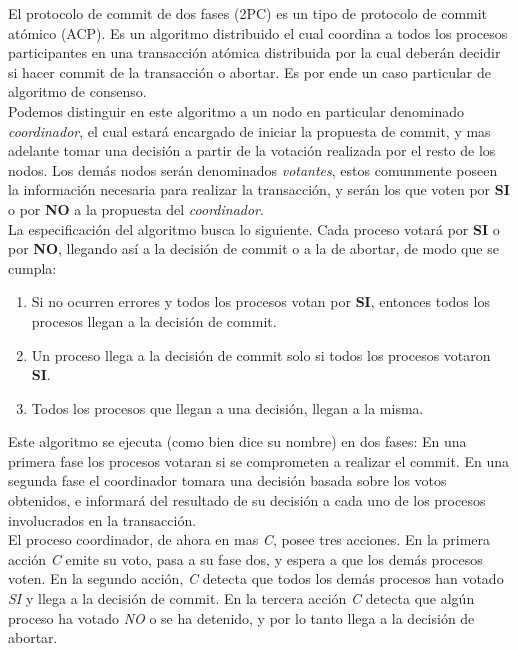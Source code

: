 \documentclass[titlepage, 12pt]{book}
\begin{document}
El protocolo de commit de dos fases (2PC) es un tipo de protocolo de commit at\'omico (ACP). Es un algoritmo distribuido el cual coordina a todos los procesos participantes en una transacci\'on at\'omica distribuida por la cual deber\'an decidir si hacer commit de la transacci\'on o abortar. Es por ende un caso particular de algoritmo de consenso.\\

Podemos distinguir en este algoritmo a un nodo en particular denominado \textit{coordinador}, el cual estar\'a encargado de iniciar la propuesta de commit, y mas adelante tomar una decisi\'on a partir de la votaci\'on realizada por el resto de los nodos. Los dem\'as nodos ser\'an denominados \textit{votantes}, estos comunmente poseen la informaci\'on necesaria para realizar la transacci\'on, y ser\'an los que voten por \textbf{SI} o por \textbf{NO} a la propuesta del \textit{coordinador}.\\

La especificaci\'on del algoritmo busca lo siguiente. Cada proceso votar\'a por \textbf{SI} o por \textbf{NO}, llegando as\'i a la decisi\'on de commit o a la de abortar, de modo que se cumpla:
\begin{enumerate}
\item Si no ocurren errores y todos los procesos votan por \textbf{SI}, entonces todos los procesos llegan a la decisi\'on de commit.
\item Un proceso llega a la decisi\'on de commit solo si todos los procesos votaron \textbf{SI}.
\item Todos los procesos que llegan a una decisi\'on, llegan a la misma.
\end{enumerate}


Este algoritmo se ejecuta (como bien dice su nombre) en dos fases: En una primera fase los procesos votaran si se comprometen a realizar el commit. En una segunda fase el coordinador tomara una decisi\'on basada sobre los votos obtenidos, e informar\'a del resultado de su decisi\'on a cada uno de los procesos involucrados en la transacci\'on\cite{Arora}.\\

El proceso coordinador, de ahora en mas \textit{C}, posee tres acciones. En la primera acci\'on \textit{C} emite su voto, pasa a su fase dos, y espera a que los dem\'as procesos voten. En la segundo acci\'on, \textit{C} detecta que todos los dem\'as procesos han votado \textit{SI} y llega a la decisi\'on de commit. En la tercera acci\'on \textit{C} detecta que alg\'un proceso ha votado \textit{NO} o se ha detenido, y por lo tanto llega a la decisi\'on de abortar.\\
\end{document}
